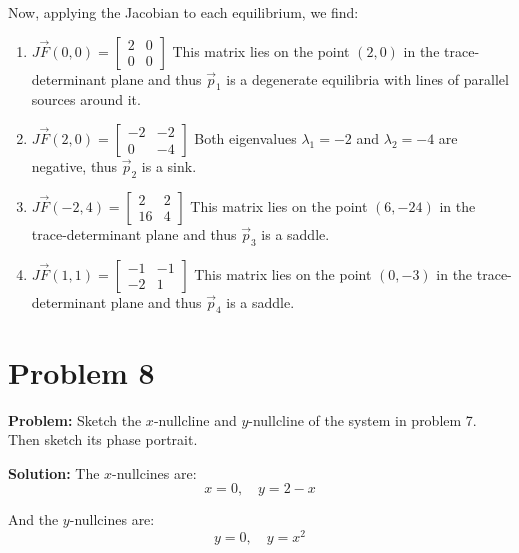 \documentclass{article}
\begin{document}
Now, applying the Jacobian to each equilibrium, we find:
\begin{enumerate}[label=\alph*)]
  \item $J\vec F(0,0)=\begin{bmatrix}
    2 & 0\\
    0 & 0
  \end{bmatrix}$ This matrix lies on the point $(2,0)$ in the trace-determinant plane and thus $\vec p_1$ is a degenerate equilibria with lines of parallel sources around it. 
  \item $J\vec F(2,0)=\begin{bmatrix}
    -2 & -2\\
    0 & -4
  \end{bmatrix}$ Both eigenvalues $\lambda_1=-2$ and $\lambda_2=-4$ are negative, thus $\vec p_2$ is a sink.
  \item $J\vec F(-2,4)=\begin{bmatrix}
    2 & 2\\
    16 & 4
  \end{bmatrix}$ This matrix lies on the point $(6,-24)$ in the trace-determinant plane and thus $\vec p_3$ is a saddle. 
  \item $J\vec F(1,1)=\begin{bmatrix}
    -1 & -1\\
    -2 & 1
  \end{bmatrix}$ This matrix lies on the point $(0,-3)$ in the trace-determinant plane and thus $\vec p_4$ is a saddle.
\end{enumerate}

\section*{Problem 8}
\noindent\textbf{Problem:} Sketch the $x$-nullcline and $y$-nullcline of the system in problem 7. Then sketch its phase portrait.
\bigskip

\noindent\textbf{Solution:} The $x$-nullcines are:
\begin{equation*}
  x=0,\quad y=2-x
\end{equation*}

And the $y$-nullcines are:
\begin{equation*}
  y=0,\quad y=x^2
\end{equation*}
\end{document}
